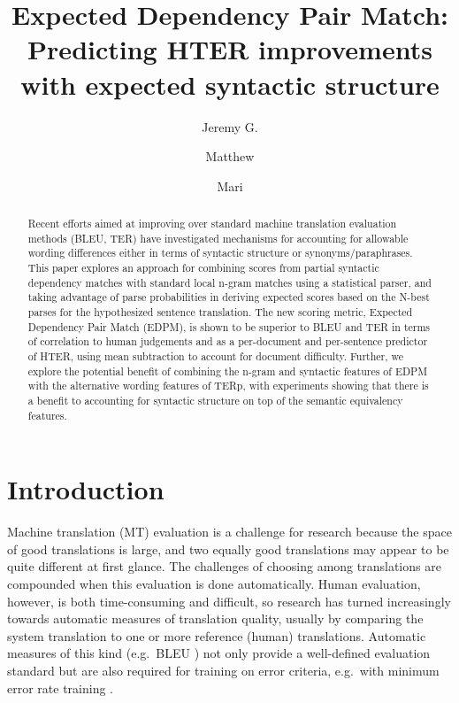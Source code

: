 \documentclass{kluwer}    %
\begin{document}
\begin{article}
\begin{opening}         
\title{Expected Dependency Pair Match:\\
Predicting {HTER} improvements with expected syntactic structure} 
\author{Jeremy G. }  
\author{Matthew }
\author{Mari }  

\begin{abstract}
  Recent efforts aimed at improving over standard machine translation
  evaluation methods (BLEU, TER) have investigated mechanisms for
  accounting for allowable wording differences either in terms of
  syntactic structure or synonyms/paraphrases. This paper explores an
  approach for combining scores from partial syntactic dependency
  matches with standard local n-gram matches using a statistical
  parser, and taking advantage of parse probabilities in deriving
  expected scores based on the N-best parses for the hypothesized
  sentence translation.  The new scoring metric, Expected Dependency
  Pair Match (EDPM), is shown to be superior to BLEU and TER in terms
  of correlation to human judgements and as a per-document and
  per-sentence predictor of HTER, using mean subtraction to account
  for document difficulty. Further, we explore the potential benefit
  of combining the n-gram and syntactic features of EDPM with the
  alternative wording features of TERp, with experiments showing that
  there is a benefit to accounting for syntactic structure on top of
  the semantic equivalency features.
\end{abstract}

\end{opening}           

\normalem
\section{Introduction}
\label{sec:intro}

Machine translation (MT) evaluation is a challenge for research
because the space of good translations is large, and two equally good
translations may appear to be quite different at first glance. 
%
The challenges of choosing among translations are compounded when this
evaluation is done automatically.
%
Human evaluation, however, is both time-consuming and difficult, so
research has turned increasingly towards automatic measures of
translation quality, usually by comparing the system translation to
one or more reference (human) translations.
%
Automatic measures of this kind (e.g.\ BLEU \cite{papineni02bleu}) not
only provide a well-defined evaluation standard but are also required
for training on error criteria, e.g.\ with minimum error rate training
\cite{och03mert}.


\end{article}
\end{document}
